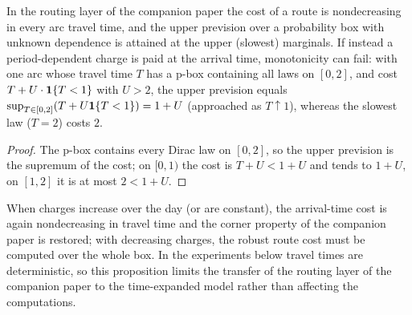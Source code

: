 \begin{proposition}\label{prop:tod}
In the routing layer of the companion paper the cost of a route is nondecreasing in every arc travel time, and the upper prevision over a probability box with unknown dependence is attained at the upper (slowest) marginals. If instead a period-dependent charge is paid at the arrival time, monotonicity can fail: with one arc whose travel time $T$ has a p-box containing all laws on $[0,2]$, and cost $T+U\cdot\mathbf{1}\{T<1\}$ with $U>2$, the upper prevision equals $\sup_{T\in[0,2]}(T+U\mathbf{1}\{T<1\})=1+U$ (approached as $T\uparrow1$), whereas the slowest law ($T=2$) costs $2$.
\end{proposition}
\begin{proof}
The p-box contains every Dirac law on $[0,2]$, so the upper prevision is the supremum of the cost; on $[0,1)$ the cost is $T+U<1+U$ and tends to $1+U$, on $[1,2]$ it is at most $2<1+U$.
\end{proof}

When charges increase over the day (or are constant), the arrival-time cost is again nondecreasing in travel time and the corner property of the companion paper is restored; with decreasing charges, the robust route cost must be computed over the whole box. In the experiments below travel times are deterministic, so this proposition limits the transfer of the routing layer of the companion paper to the time-expanded model rather than affecting the computations.

